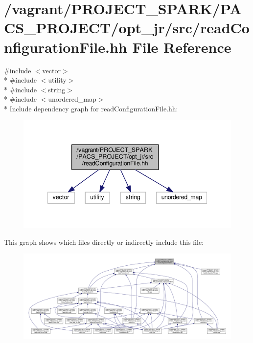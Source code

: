 \hypertarget{readConfigurationFile_8hh}{\section{/vagrant/\-P\-R\-O\-J\-E\-C\-T\-\_\-\-S\-P\-A\-R\-K/\-P\-A\-C\-S\-\_\-\-P\-R\-O\-J\-E\-C\-T/opt\-\_\-jr/src/read\-Configuration\-File.hh File Reference}
\label{readConfigurationFile_8hh}
}
{\ttfamily \#include $<$vector$>$}\\*
{\ttfamily \#include $<$utility$>$}\\*
{\ttfamily \#include $<$string$>$}\\*
{\ttfamily \#include $<$unordered\-\_\-map$>$}\\*
Include dependency graph for read\-Configuration\-File.\-hh\-:\nopagebreak
\begin{figure}[H]
\begin{center}
\leavevmode
\includegraphics[width=342pt]{readConfigurationFile_8hh__incl}
\end{center}
\end{figure}
This graph shows which files directly or indirectly include this file\-:
\nopagebreak
\begin{figure}[H]
\begin{center}
\leavevmode
\includegraphics[width=350pt]{readConfigurationFile_8hh__dep__incl}
\end{center}
\end{figure}
